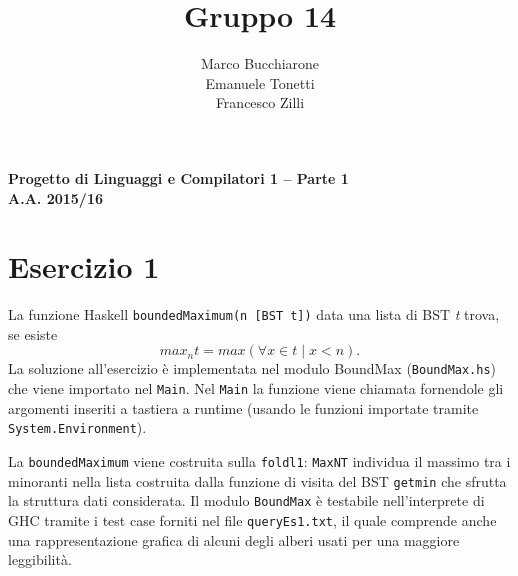\documentclass[a4paper, oneside, 11pt]{article}
\makeatletter
\renewcommand\and{\\}
\renewcommand\maketitle{%
\bigskip\bigskip\bigskip\bigskip%
\begin{center}\bfseries\large%
Progetto di Linguaggi e Compilatori 1 -- Parte 1 \\ A.A. 2015/16\\%
\end{center}%
\bigskip%
\begin{center}\bfseries\LARGE \@title  \end{center}%
\bigskip%
\begin{center}\bfseries\large \@author \end{center}%
\bigskip\bigskip}
\makeatother
\begin{document}
\title{Gruppo 14}
\author{Marco Bucchiarone \and Emanuele Tonetti \and Francesco Zilli}
\maketitle
%
\section*{Esercizio 1}
La funzione Haskell \texttt{boundedMaximum(n [BST t])} data una lista di BST \textit{t} trova, se esiste  \[max_{n}{t}=max(\forall x \in t \mid  x<n ).\]
La soluzione all'esercizio \`e implementata nel modulo BoundMax (\texttt{BoundMax.hs}) che viene importato nel \texttt{Main}.
Nel \texttt{Main} la funzione viene chiamata fornendole gli argomenti inseriti a tastiera a runtime (usando le funzioni importate tramite \texttt{System.Environment}).
\par
La \texttt{boundedMaximum} viene costruita sulla \texttt{foldl1}: \texttt{MaxNT} individua il massimo tra i minoranti nella lista costruita dalla funzione di visita del BST \texttt{getmin} che sfrutta la struttura dati considerata.
Il modulo \texttt{BoundMax} \`e testabile nell'interprete di GHC tramite i test case forniti nel file \texttt{queryEs1.txt}, il quale comprende anche una rappresentazione grafica di alcuni degli alberi usati per una maggiore leggibilit\`a.
%
\end{document}

